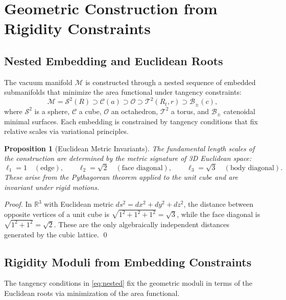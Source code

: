 \documentclass[12pt, a4paper]{article}
\newtheorem{proposition}[theorem]{Proposition}
\theoremstyle{definition}
\newcommand{\cC}{\mathcal{C}}
\newcommand{\cS}{\mathcal{S}}
\newcommand{\cT}{\mathcal{T}}
\newcommand{\cO}{\mathcal{O}}
\newcommand{\cB}{\mathcal{B}}
\newcommand{\cM}{\mathcal{M}}
\newcommand{\bbR}{\mathbb{R}}
\begin{document}
\section{Geometric Construction from Rigidity Constraints}
\label{sec:construction}

\subsection{Nested Embedding and Euclidean Roots}
The vacuum manifold $\cM$ is constructed through a nested sequence of embedded submanifolds that minimize the area functional under tangency constraints:
\begin{equation}
\cM = \cS^2(R) \supset \cC(a) \supset \cO \supset \cT^2(R_t,r) \supset \cB_{\pm}(c),
\label{eq:nested}
\end{equation}
where $\cS^2$ is a sphere, $\cC$ a cube, $\cO$ an octahedron, $\cT^2$ a torus, and $\cB_{\pm}$ catenoidal minimal surfaces. Each embedding is constrained by tangency conditions that fix relative scales via variational principles.

\begin{proposition}[Euclidean Metric Invariants]
The fundamental length scales of the construction are determined by the metric signature of 3D Euclidean space:
\begin{equation}
\ell_1 = 1 \quad (\text{edge}), \qquad \ell_2 = \sqrt{2} \quad (\text{face diagonal}), \qquad \ell_3 = \sqrt{3} \quad (\text{body diagonal}).
\end{equation}
These arise from the Pythagorean theorem applied to the unit cube and are invariant under rigid motions.
\end{proposition}

\begin{proof}
In $\bbR^3$ with Euclidean metric $ds^2 = dx^2 + dy^2 + dz^2$, the distance between opposite vertices of a unit cube is $\sqrt{1^2+1^2+1^2} = \sqrt{3}$, while the face diagonal is $\sqrt{1^2+1^2} = \sqrt{2}$. These are the only algebraically independent distances generated by the cubic lattice. \qed
\end{proof}

\subsection{Rigidity Moduli from Embedding Constraints}
The tangency conditions in \eqref{eq:nested} fix the geometric moduli in terms of the Euclidean roots via minimization of the area functional.
\end{document}
